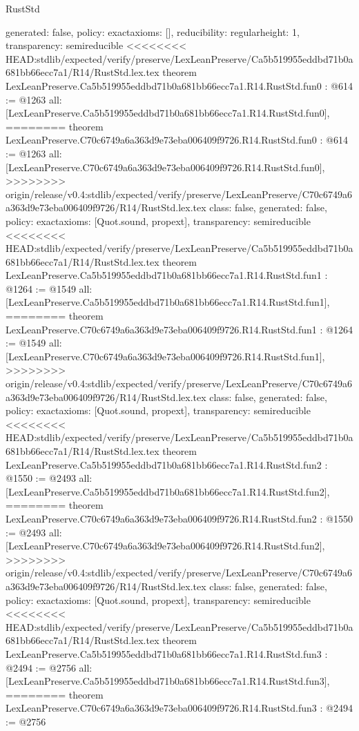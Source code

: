 \begin{lexlean}{RustStd}
\begin{coremodule}
{\begin{coremodule}
{{{  generated: false,
  policy: exact{axioms: []},
  reducibility: regular{height: 1},
  transparency: semireducible
}
<<<<<<<< HEAD:stdlib/expected/verify/preserve/LexLeanPreserve/Ca5b519955eddbd71b0a681bb66ecc7a1/R14/RustStd.lex.tex
theorem LexLeanPreserve.Ca5b519955eddbd71b0a681bb66ecc7a1.R14.RustStd.fun0 : @614 := @1263 {
  all: [LexLeanPreserve.Ca5b519955eddbd71b0a681bb66ecc7a1.R14.RustStd.fun0],
========
theorem LexLeanPreserve.C70c6749a6a363d9e73eba006409f9726.R14.RustStd.fun0 : @614 := @1263 {
  all: [LexLeanPreserve.C70c6749a6a363d9e73eba006409f9726.R14.RustStd.fun0],
>>>>>>>> origin/release/v0.4:stdlib/expected/verify/preserve/LexLeanPreserve/C70c6749a6a363d9e73eba006409f9726/R14/RustStd.lex.tex
  class: false,
  generated: false,
  policy: exact{axioms: [Quot.sound, propext]},
  transparency: semireducible
}
<<<<<<<< HEAD:stdlib/expected/verify/preserve/LexLeanPreserve/Ca5b519955eddbd71b0a681bb66ecc7a1/R14/RustStd.lex.tex
theorem LexLeanPreserve.Ca5b519955eddbd71b0a681bb66ecc7a1.R14.RustStd.fun1 : @1264 := @1549 {
  all: [LexLeanPreserve.Ca5b519955eddbd71b0a681bb66ecc7a1.R14.RustStd.fun1],
========
theorem LexLeanPreserve.C70c6749a6a363d9e73eba006409f9726.R14.RustStd.fun1 : @1264 := @1549 {
  all: [LexLeanPreserve.C70c6749a6a363d9e73eba006409f9726.R14.RustStd.fun1],
>>>>>>>> origin/release/v0.4:stdlib/expected/verify/preserve/LexLeanPreserve/C70c6749a6a363d9e73eba006409f9726/R14/RustStd.lex.tex
  class: false,
  generated: false,
  policy: exact{axioms: [Quot.sound, propext]},
  transparency: semireducible
}
<<<<<<<< HEAD:stdlib/expected/verify/preserve/LexLeanPreserve/Ca5b519955eddbd71b0a681bb66ecc7a1/R14/RustStd.lex.tex
theorem LexLeanPreserve.Ca5b519955eddbd71b0a681bb66ecc7a1.R14.RustStd.fun2 : @1550 := @2493 {
  all: [LexLeanPreserve.Ca5b519955eddbd71b0a681bb66ecc7a1.R14.RustStd.fun2],
========
theorem LexLeanPreserve.C70c6749a6a363d9e73eba006409f9726.R14.RustStd.fun2 : @1550 := @2493 {
  all: [LexLeanPreserve.C70c6749a6a363d9e73eba006409f9726.R14.RustStd.fun2],
>>>>>>>> origin/release/v0.4:stdlib/expected/verify/preserve/LexLeanPreserve/C70c6749a6a363d9e73eba006409f9726/R14/RustStd.lex.tex
  class: false,
  generated: false,
  policy: exact{axioms: [Quot.sound, propext]},
  transparency: semireducible
}
<<<<<<<< HEAD:stdlib/expected/verify/preserve/LexLeanPreserve/Ca5b519955eddbd71b0a681bb66ecc7a1/R14/RustStd.lex.tex
theorem LexLeanPreserve.Ca5b519955eddbd71b0a681bb66ecc7a1.R14.RustStd.fun3 : @2494 := @2756 {
  all: [LexLeanPreserve.Ca5b519955eddbd71b0a681bb66ecc7a1.R14.RustStd.fun3],
========
theorem LexLeanPreserve.C70c6749a6a363d9e73eba006409f9726.R14.RustStd.fun3 : @2494 := @2756 {
}}}}}}}
\end{coremodule}}
\end{coremodule}
\end{lexlean}
